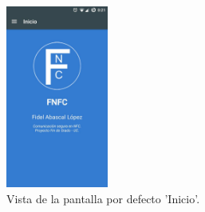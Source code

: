 \documentclass[../PFC.tex]{subfiles}
\begin{document}
\begin{figure}[H]
  \centering
  \includegraphics[width=0.3\textwidth]{./img/app/pantallaPrincipal}
  \caption{Vista de la pantalla por defecto 'Inicio'.}
  \label{img:app:inicio}
\end{figure}


\end{document}
